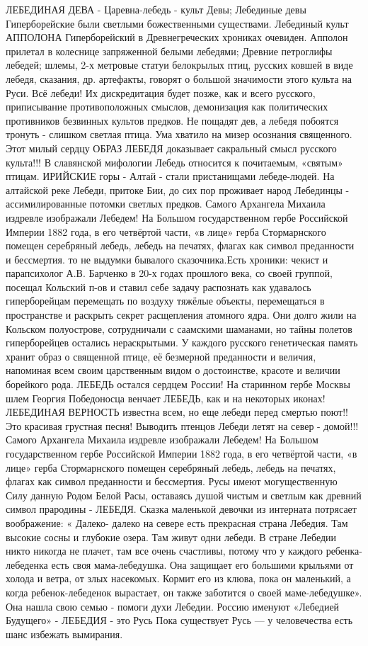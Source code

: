 ЛЕБЕДИНАЯ ДЕВА - Царевна-лебедь - культ Девы;
Лебединые девы Гиперборейские были светлыми божественными существами.
Лебединый культ АППОЛОНА  Гиперборейский в  Древнегреческих хрониках  очевиден. Апполон прилетал в колеснице запряженной белыми лебедями;
Древние петроглифы лебедей; шлемы, 2-х метровые статуи белокрылых птиц, русских ковшей в виде лебедя, сказания,  др. артефакты, говорят о большой  значимости  этого культа на Руси.  Всё лебеди! 
Их дискредитация будет позже,  как и всего русского, приписывание противоположных смыслов, демонизация как политических противников  безвинных культов предков.   Не пощадят дев, а лебедя побоятся тронуть - слишком светлая птица. Ума хватило на мизер осознания священного.
Этот милый сердцу ОБРАЗ ЛЕБЕДЯ доказывает сакральный смысл русского культа!!!
В славянской мифологии Лебедь относится к почитаемым, «святым» птицам.
ИРИЙСКИЕ горы - Алтай - стали  пристанищами  лебеде-людей. На алтайской реке Лебеди, притоке Бии, до сих пор проживает народ Лебединцы - ассимилированные потомки светлых предков.
Самого Архангела Михаила издревле изображали Лебедем!
На Большом государственном гербе Российской Империи 1882 года, в его четвёртой части, «в лице» герба Стормарнского помещен серебряный лебедь, лебедь на печатях, флагах как символ преданности и бессмертия.
то не выдумки бывалого сказочника.Есть хроники: чекист и парапсихолог А.В. Барченко в 20-х годах прошлого века, со своей группой, посещал Кольский п-ов и ставил себе задачу распознать как удавалось гиперборейцам перемещать по воздуху тяжёлые объекты, перемещаться в пространстве и раскрыть секрет расщепления атомного ядра. Они долго жили на Кольском полуострове, сотрудничали с саамскими шаманами, но тайны полетов гиперборейцев остались нераскрытыми.
У  каждого русского генетическая память хранит образ о священной птице, её безмерной преданности и величия, напоминая всем своим царственным видом о достоинстве, красоте и величии борейкого рода.
ЛЕБЕДЬ  остался сердцем России! 
                                          На старинном гербе Москвы шлем Георгия Победоносца венчает ЛЕБЕДЬ, как и на некоторых иконах!
ЛЕБЕДИНАЯ ВЕРНОСТЬ известна всем, но еще лебеди перед смертью поют!!
Это красивая грустная песня! Выводить птенцов Лебеди летят на север - домой!!!
Самого Архангела Михаила издревле изображали Лебедем!
На Большом государственном гербе Российской Империи 1882 года, в его четвёртой части, «в лице» герба Стормарнского помещен серебряный лебедь, лебедь на печатях, флагах как символ преданности и бессмертия.
Русы имеют могущественную Силу данную Родом Белой Расы, оставаясь душой чистым и светлым как древний символ прародины - ЛЕБЕДЯ.
Сказка маленькой девочки из интерната потрясает воображение: « Далеко- далеко на севере есть прекрасная страна Лебедия. Там высокие сосны и глубокие озера. Там живут одни лебеди. В стране Лебедии никто никогда не плачет, там все очень счастливы, потому что у каждого ребенка-лебеденка есть своя мама-лебедушка. Она защищает его большими крыльями от холода и ветра, от злых насекомых. Кормит его из клюва, пока он маленький, а когда ребенок-лебеденок вырастает, он также заботится о своей маме-лебедушке». Она нашла свою семью - помоги духи Лебедии.
Россию именуют «Лебедией Будущего» - ЛЕБЕДИЯ - это Русь
Пока существует Русь --- у человечества есть шанс избежать вымирания.

